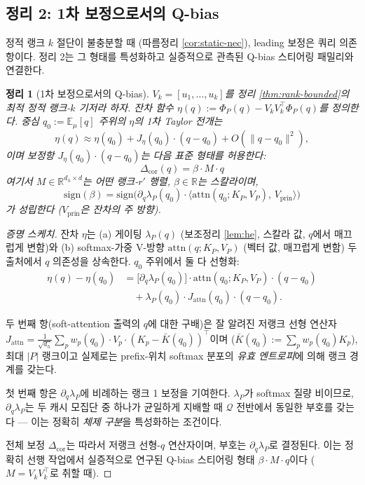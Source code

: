 \documentclass{article}
\newtheorem{theorem}{정리}
\theoremstyle{definition}
\newcommand{\R}{\mathbb{R}}
\newcommand{\E}{\mathbb{E}}
\newcommand{\Phip}{\Phi_P}
\newcommand{\dh}{d_h}
\newcommand{\attn}{\mathrm{attn}}
\begin{document}
\subsection{정리 2: 1차 보정으로서의 Q-bias}
\label{sec:thm2}

정적 랭크 $k$ 절단이 불충분할 때 (따름정리 \ref{cor:static-nec}), leading 보정은 쿼리 의존 항이다. 정리 2는 그 형태를 특성화하고 실증적으로 관측된 Q-bias 스티어링 패밀리와 연결한다.

\begin{theorem}[1차 보정으로서의 Q-bias]
\label{thm:qbias}
$V_k = [u_1,\dots,u_k]$를 정리 \ref{thm:rank-bounded}의 최적 정적 랭크-$k$ 기저라 하자. 잔차 함수 $\eta(q) := \Phip(q) - V_kV_k^\top\Phip(q)$를 정의한다. 중심 $q_0 := \E_\mu[q]$ 주위의 $\eta$의 1차 Taylor 전개는
\begin{equation}
\eta(q) \approx \eta(q_0) + J_\eta(q_0)\cdot (q - q_0) + O(\|q-q_0\|^2),
\end{equation}
이며 보정항 $J_\eta(q_0)\cdot(q-q_0)$는 다음 표준 형태를 허용한다:
\begin{equation}
\Delta_{\mathrm{cor}}(q) = \beta \cdot M\cdot q
\label{eq:qbias-form}
\end{equation}
여기서 $M\in\R^{\dh\times d}$는 어떤 랭크-$r'$ 행렬, $\beta\in\R$는 스칼라이며,
\[
\mathrm{sign}(\beta) = \mathrm{sign}\bigl(\partial_q \lambda_P(q_0)\cdot \langle\attn(q_0;K_P,V_P),\, V_{\mathrm{prin}}\rangle\bigr)
\]
가 성립한다 ($V_{\mathrm{prin}}$은 잔차의 주 방향).
\end{theorem}

\begin{proof}[증명 스케치]
잔차 $\eta$는 (a) 게이팅 $\lambda_P(q)$ (보조정리 \ref{lem:he}, 스칼라 값, $q$에서 매끄럽게 변함)와 (b) softmax-가중 V-방향 $\attn(q;K_P,V_P)$ (벡터 값, 매끄럽게 변함) 두 출처에서 $q$ 의존성을 상속한다. $q_0$ 주위에서 둘 다 선형화:
\begin{align}
\eta(q) - \eta(q_0) &= \bigl[\partial_q \lambda_P(q_0)\bigr]\cdot \attn(q_0;K_P,V_P)\cdot(q-q_0) \nonumber\\
&\quad + \lambda_P(q_0)\cdot J_{\attn}(q_0)\cdot (q-q_0).
\end{align}

두 번째 항(soft-attention 출력의 $q$에 대한 구배)은 잘 알려진 저랭크 선형 연산자 $J_{\attn} = \tfrac{1}{\sqrt{\dh}}\sum_p w_p(q_0) \cdot V_p \cdot (K_p - \bar{K}(q_0))^\top$이며 ($\bar{K}(q_0) := \sum_p w_p(q_0) K_p$), 최대 $|P|$ 랭크이고 실제로는 prefix-위치 softmax 분포의 \emph{유효 엔트로피}에 의해 랭크 경계를 갖는다.

첫 번째 항은 $\partial_q\lambda_P$에 비례하는 랭크 1 보정을 기여한다. $\lambda_P$가 softmax 질량 비이므로, $\partial_q\lambda_P$는 두 캐시 모집단 중 하나가 균일하게 지배할 때 $\mathcal{Q}$ 전반에서 동일한 부호를 갖는다 --- 이는 정확히 \emph{체제 구분}을 특성화하는 조건이다.

전체 보정 $\Delta_{\mathrm{cor}}$는 따라서 저랭크 선형-$q$ 연산자이며, 부호는 $\partial_q \lambda_P$로 결정된다. 이는 정확히 선행 작업에서 실증적으로 연구된 Q-bias 스티어링 형태 $\beta\cdot M\cdot q$이다 ($M = V_k V_k^\top$로 취할 때).
\end{proof}
\end{document}
